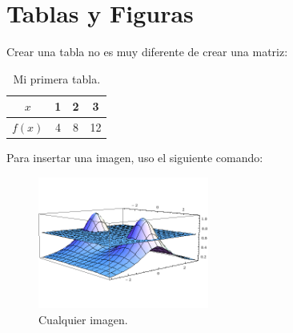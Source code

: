 \documentclass{article}
\begin{document}
	\section{Tablas y Figuras}
	
	Crear una tabla no es muy diferente de crear una matriz:
	
	\begin{table}[H]
		\centering
		\begin{tabular}{|c|c|c|c|}
			\hline
			$x$ & 1 & 2 & 3 \\
			\hline
			$f(x)$ & 4 & 8 & 12 \\
			\hline
		\end{tabular}
		\caption{Mi primera tabla.}
	\end{table}
	
	Para insertar una imagen, uso el siguiente comando:
	
	\begin{figure}[H]
		\centering
		\includegraphics[width=0.5\textwidth]{image.png}
		\caption{Cualquier imagen.}
	\end{figure}
	
	
\end{document}
